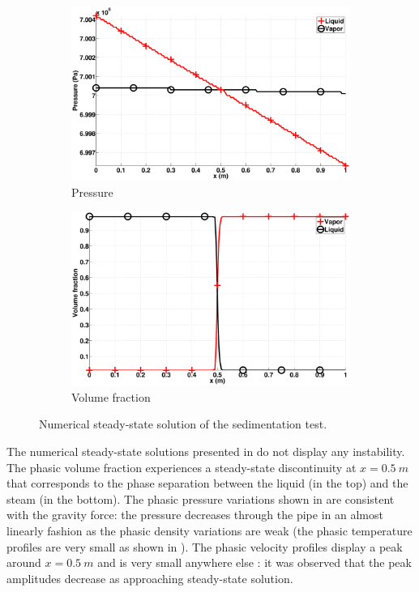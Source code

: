 \documentclass[preprint,10pt]{elsarticle}
\begin{document}
\begin{figure}[H]
        \begin{subfigure}[b]{0.495\textwidth}
                \centering
                \includegraphics[width=\textwidth]{figures/hydrostatic-_two_phases_pressure.eps}
                \caption{Pressure}
                \label{fig:hydrostatic--press}
        \end{subfigure}        
        \begin{subfigure}[b]{0.495\textwidth}
                \centering
                \includegraphics[width=\textwidth]{figures/hydrostatic-_two_phases_volume_fraction.eps}
                \caption{Volume fraction}
                \label{fig:hydrostatic--vf}
        \end{subfigure}
        \caption{Numerical steady-state solution of the sedimentation test.}\label{fig:hydrostatic--variables}
\end{figure}
%
The numerical steady-state solutions presented in  do not display any instability. The phasic volume fraction experiences a steady-state discontinuity at $x=0.5 \ m$ that corresponds to the phase separation between the liquid (in the top) and the steam (in the bottom). The phasic pressure variations shown in  are consistent with the gravity force: the pressure decreases through the pipe in an almost linearly fashion as the phasic density variations are weak (the phasic temperature profiles are very small as shown in ). The phasic velocity profiles display a peak around $x=0.5 \ m$ and is very small anywhere else : it was observed that the peak amplitudes decrease as approaching steady-state solution.
\end{document}
